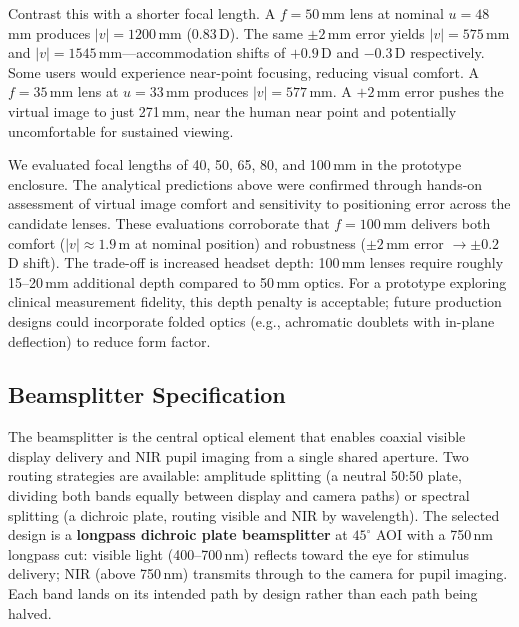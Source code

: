 Contrast this with a shorter focal length. A $f = 50$\,mm lens at nominal $u = 48$\,mm produces $|v| = 1200$\,mm (0.83\,D). The same $\pm 2$\,mm error yields $|v| = 575$\,mm and $|v| = 1545$\,mm---accommodation shifts of $+0.9$\,D and $-0.3$\,D respectively. Some users would experience near-point focusing, reducing visual comfort. A $f = 35$\,mm lens at $u = 33$\,mm produces $|v| = 577$\,mm. A $+2$\,mm error pushes the virtual image to just 271\,mm, near the human near point and potentially uncomfortable for sustained viewing.

We evaluated focal lengths of 40, 50, 65, 80, and 100\,mm in the prototype enclosure. The analytical predictions above were confirmed through hands-on assessment of virtual image comfort and sensitivity to positioning error across the candidate lenses. These evaluations corroborate that $f = 100$\,mm delivers both comfort ($|v| \approx 1.9$\,m at nominal position) and robustness ($\pm 2$\,mm error $\to \pm 0.2$\,D shift). The trade-off is increased headset depth: 100\,mm lenses require roughly 15--20\,mm additional depth compared to 50\,mm optics. For a prototype exploring clinical measurement fidelity, this depth penalty is acceptable; future production designs could incorporate folded optics (e.g., achromatic doublets with in-plane deflection) to reduce form factor.



\subsection{Beamsplitter Specification}
\label{sec:hw-beamsplitter-spec}

The beamsplitter is the central optical element that enables coaxial visible display delivery and NIR pupil imaging from a single shared aperture. Two routing strategies are available: amplitude splitting (a neutral 50:50 plate, dividing both bands equally between display and camera paths) or spectral splitting (a dichroic plate, routing visible and NIR by wavelength). The selected design is a \textbf{longpass dichroic plate beamsplitter} at $45^{\circ}$ AOI with a 750\,nm longpass cut: visible light (400--700\,nm) reflects toward the eye for stimulus delivery; NIR (above 750\,nm) transmits through to the camera for pupil imaging. Each band lands on its intended path by design rather than each path being halved.

